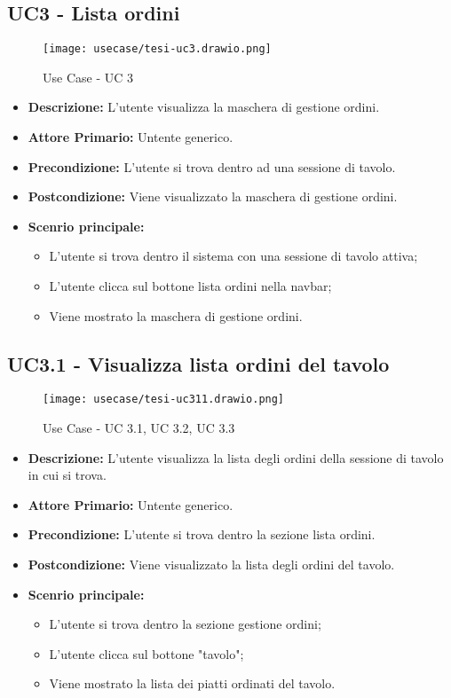 \subsection{UC3 - Lista ordini}
\begin{figure}[H]
    \centering
    \texttt{[image: usecase/tesi-uc3.drawio.png]}
    \caption{Use Case - UC 3}
\end{figure}
\begin{itemize}
    \item \textbf{Descrizione:} L'utente visualizza la maschera di gestione ordini.
    \item \textbf{Attore Primario:} Untente generico.
    \item \textbf{Precondizione:} L'utente si trova dentro ad una sessione di tavolo.
    \item \textbf{Postcondizione:} Viene visualizzato la maschera di gestione ordini.
    \item \textbf{Scenrio principale:}
    \begin{itemize}
        \item L'utente si trova dentro il sistema con una sessione di tavolo attiva;
        \item L'utente clicca sul bottone lista ordini nella navbar;
        \item Viene mostrato la maschera di gestione ordini.
    \end{itemize}
\end{itemize}
\subsection{UC3.1 - Visualizza lista ordini del tavolo}
\begin{figure}[H]
    \centering
    \texttt{[image: usecase/tesi-uc311.drawio.png]}
    \caption{Use Case - UC 3.1, UC 3.2, UC 3.3}
\end{figure}
\begin{itemize}
    \item \textbf{Descrizione:} L'utente visualizza la lista degli ordini della sessione di tavolo in cui si trova. 
    \item \textbf{Attore Primario:} Untente generico.
    \item \textbf{Precondizione:} L'utente si trova dentro la sezione lista ordini.
    \item \textbf{Postcondizione:} Viene visualizzato la lista degli ordini del tavolo.
    \item \textbf{Scenrio principale:}
    \begin{itemize}
        \item L'utente si trova dentro la sezione gestione ordini;
        \item L'utente clicca sul bottone "tavolo";
        \item Viene mostrato la lista dei piatti ordinati del tavolo.
    \end{itemize}
\end{itemize}
